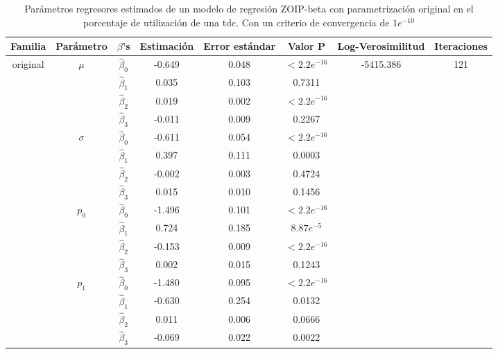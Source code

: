 \begin{table}[!hbt]
{\scriptsize
\begin{center}
\begin{tabular}{|c|c|c|ccc|c|c|}\hline
Familia & Par\'{a}metro & $\beta$'s & Estimaci\'{o}n & Error est\'{a}ndar & Valor P & Log-Verosimilitud & Iteraciones \\ \hline \hline
\multirow{12}{*}{original} & \multirow{4}{*}{$\mu$} & $\hat{\beta}_0$ & -0.649	&0.048	&$<2.2e^{-16}$  & \multirow{12}{*}{-5415.386} & \multirow{12}{*}{121} \\
& & $\hat{\beta}_1$ & 0.035	&0.103	&0.7311   & &\\
& & $\hat{\beta}_2$ & 0.019	&0.002	&$<2.2e^{-16}$   & &\\
& & $\hat{\beta}_3$ & -0.011	&0.009	&0.2267 & & \\ \cline{2-6}
& \multirow{4}{*}{$\sigma$} & $\hat{\beta}_0$ & -0.611	&0.054	&$<2.2e^{-16}$   & &\\
& & $\hat{\beta}_1$ & 0.397	&0.111	&0.0003   & &\\
& & $\hat{\beta}_2$ & -0.002	&0.003	&0.4724   & &\\
& & $\hat{\beta}_3$ & 0.015	&0.010	&0.1456   & &\\ \cline{2-6}
& \multirow{4}{*}{$p_0$} & $\hat{\beta}_0$ & -1.496	&0.101	&$<2.2e^{-16}$  & &\\
& & $\hat{\beta}_1$ & 0.724	&0.185	&$8.87e^{-5}$  & &\\
& & $\hat{\beta}_2$ & -0.153	&0.009	&$<2.2e^{-16}$  & &\\
& & $\hat{\beta}_3$ & 0.002	&0.015	&0.1243  & &\\ \cline{2-6}
& \multirow{4}{*}{$p_1$} & $\hat{\beta}_0$ &-1.480	&0.095	&$<2.2e^{-16}$  & &\\
& & $\hat{\beta}_1$ & -0.630	&0.254	&0.0132  & &\\
& & $\hat{\beta}_2$ & 0.011	&0.006	&0.0666  & &\\
& & $\hat{\beta}_3$ & -0.069	&0.022	&0.0022  & &\\ \hline


\end{tabular}
\caption{Par\'{a}metros regresores estimados de un modelo de regresi\'{o}n ZOIP-beta con parametrizaci\'{o}n original en el porcentaje de utilizaci\'{o}n de una tdc. Con un criterio de convergencia de $1e^{-10}$}
\label{T_Apli_CC_Ori}
\end{center}
}
\end{table}


